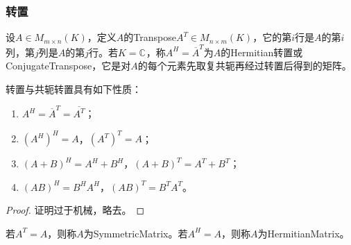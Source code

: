 \subsubsection{转置}
\begin{definition}
	设$A\in M_{m\times n}(K)$，定义$A$的\gls{Transpose}$A^T\in M_{n\times m}(K)$，它的第$i$行是$A$的第$i$列，第$j$列是$A$的第$j$行。若$K=\mathbb{C}^{}$，称$A^H=\overline{A}^T$为$A$的Hermitian转置或\gls{ConjugateTranspose}，它是对$A$的每个元素先取复共轭再经过转置后得到的矩阵。
\end{definition}
\begin{property}\label{Transpose}
	转置与共轭转置具有如下性质：
	\begin{enumerate}
		\item $A^H=\overline{A}^T=\overline{A^T}$；
		\item $(A^H)^H=A$，$(A^T)^T=A$；
		\item $(A+B)^H=A^H+B^H$，$(A+B)^T=A^T+B^T$；
		\item $(AB)^H=B^HA^H$，$(AB)^T=B^TA^T$。
	\end{enumerate}
\end{property}
\begin{proof}
	证明过于机械，略去。
\end{proof}
\begin{definition}
	若$A^T=A$，则称$A$为\gls{SymmetricMatrix}。若$A^H=A$，则称$A$为\gls{HermitianMatrix}。
\end{definition}
